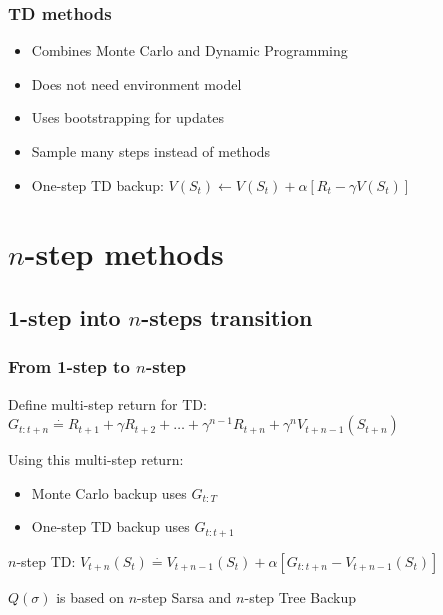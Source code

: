 \documentclass{beamer}
\begin{document}
\begin{frame}
  \frametitle{TD methods}
  \begin{itemize}
    \item Combines Monte Carlo and Dynamic Programming
    \item Does not need environment model
    \item Uses bootstrapping for updates
    \item Sample many steps instead of methods
    \item One-step TD backup: $V(S_t) \leftarrow V(S_t) +
      \alpha[R_t - \gamma V(S_t)]$
  \end{itemize}
\end{frame}

\section{$n$-step methods}

\subsection{1-step into $n$-steps transition}

\begin{frame}
  \frametitle{From 1-step to $n$-step}
  Define multi-step return for TD: $G_{t : t + n} \overset{\cdot}{=} R_{t + 1} +
    \gamma R_{t + 2} + \ldots + \gamma^{n - 1} R_{t + n} +
    \gamma^n V_{t + n - 1}(S_{t + n})$

  Using this multi-step return:
  \begin{itemize}
    \item Monte Carlo backup uses $G_{t : T}$
    \item One-step TD backup uses $G_{t : t + 1}$
  \end{itemize}

  $n$-step TD: $V_{t + n}(S_t) \overset{\cdot}{=} V_{t + n - 1}(S_t) +
    \alpha [G_{t : t + n} - V_{t + n - 1}(S_t)]$

  $Q(\sigma)$ is based on $n$-step Sarsa and $n$-step Tree Backup
\end{frame}

\end{document}
